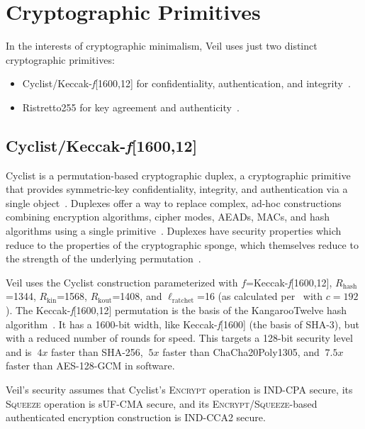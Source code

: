 \section{Cryptographic Primitives}\label{sec:cryptographic-primitives}

In the interests of cryptographic minimalism, Veil uses just two distinct cryptographic primitives:

\begin{itemize}
    \item Cyclist/Keccak-\emph{f}[1600,12] for confidentiality, authentication, and
    integrity~\cite{daemen2020,bertoni2018}.
    \item Ristretto255 for key agreement and authenticity~\cite{deValence2020}.
\end{itemize}

\subsection{Cyclist/Keccak-\emph{f}[1600,12]}\label{subsec:cyclist}

Cyclist is a permutation-based cryptographic duplex, a cryptographic primitive that provides symmetric-key
confidentiality, integrity, and authentication via a single object~\cite{daemen2020}.
Duplexes offer a way to replace complex, ad-hoc constructions combining encryption algorithms, cipher modes,
AEADs, MACs, and hash algorithms using a single primitive~\cite{daemen2020, bertoni2011duplex}.
Duplexes have security properties which reduce to the properties of the cryptographic sponge, which themselves reduce to
the strength of the underlying permutation~\cite{bertoni2008}.

Veil uses the Cyclist construction parameterized with $f$=Keccak-\emph{f}[1600,12], $R_\text{hash}$=1344,
$R_\text{kin}$=1568, $R_\text{kout}$=1408, and $\ell_\text{ratchet}$=16 (as calculated per~\cite{bertoni2015keyak} with
$c=192$).
The Keccak-\emph{f}[1600,12] permutation is the basis of the KangarooTwelve hash algorithm~\cite{bertoni2018}.
It has a 1600-bit width, like Keccak-\emph{f}[1600] (the basis of SHA-3), but with a reduced number of rounds for speed.
This targets a 128-bit security level and is $~4x$ faster than SHA-256, $~5x$ faster than ChaCha20Poly1305, and $~7.5x$
faster than AES-128-GCM in software.

Veil's security assumes that Cyclist's \textsc{Encrypt} operation is IND-CPA secure, its
\textsc{Squeeze} operation is sUF-CMA secure, and its
\textsc{Encrypt}/\textsc{Squeeze}-based authenticated encryption construction is IND-CCA2 secure.

